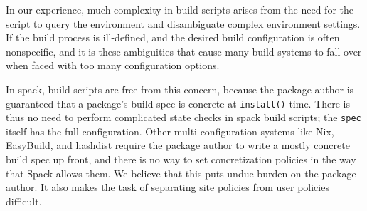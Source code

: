 In our experience, much complexity in build scripts arises from the need for the script to
query the environment and disambiguate complex environment settings.  If the build process is
ill-defined, and the desired build configuration is often nonspecific, and it is these
ambiguities that cause many build systems to fall over when faced with too many configuration
options.


In spack, build scripts are free from this concern, because the package author
is guaranteed that a package's build spec is concrete at {\tt install()} time.
There is thus no need to perform complicated state checks in spack build scripts;
the {\tt spec} itself has the full configuration.  Other multi-configuration systems like Nix, 
EasyBuild, and hashdist require the package author to write a mostly concrete build
spec up front, and there is no way to set concretization policies in the way that Spack
allows them.  We believe that this puts undue burden on the package author.  It also makes
the task of separating site policies from user policies difficult.













